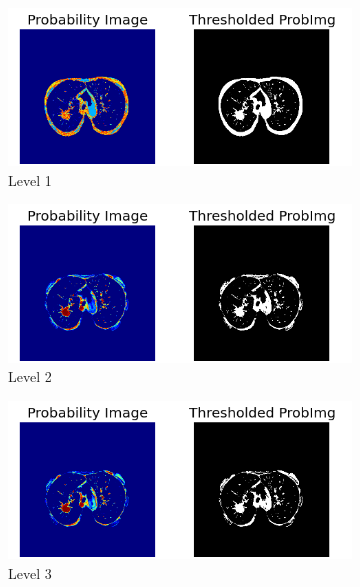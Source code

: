 \begin{figure}[p]
\begin{center}
	\begin{subfigure}[b]{\linewidth}
		\includegraphics[width=\linewidth]{img/cascades/D50L1S95.png}
		\caption{Level 1}
	\end{subfigure}
	\begin{subfigure}[b]{\linewidth}
		\includegraphics[width=\linewidth]{img/cascades/D50L2S95.png}
		\caption{Level 2}
	\end{subfigure}
	\begin{subfigure}[b]{\linewidth}
		\includegraphics[width=\linewidth]{img/cascades/D50L3S95.png}
		\caption{Level 3}
	\end{subfigure}
	\begin{subfigure}[b]{\linewidth}

\end{subfigure}
\end{center}
\end{figure}
